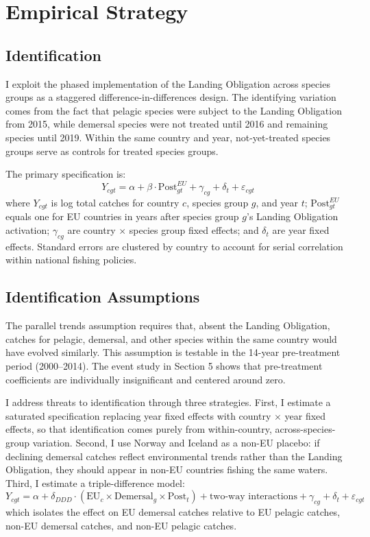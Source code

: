 \documentclass[12pt]{article}
\begin{document}



\section{Empirical Strategy}

\subsection{Identification}

I exploit the phased implementation of the Landing Obligation across species groups as a staggered difference-in-differences design. The identifying variation comes from the fact that pelagic species were subject to the Landing Obligation from 2015, while demersal species were not treated until 2016 and remaining species until 2019. Within the same country and year, not-yet-treated species groups serve as controls for treated species groups.

The primary specification is:
\begin{equation}
Y_{cgt} = \alpha + \beta \cdot \text{Post}_{gt}^{EU} + \gamma_{cg} + \delta_t + \varepsilon_{cgt}
\label{eq:twfe}
\end{equation}
where $Y_{cgt}$ is log total catches for country $c$, species group $g$, and year $t$; $\text{Post}_{gt}^{EU}$ equals one for EU countries in years after species group $g$'s Landing Obligation activation; $\gamma_{cg}$ are country $\times$ species group fixed effects; and $\delta_t$ are year fixed effects. Standard errors are clustered by country to account for serial correlation within national fishing policies.

\subsection{Identification Assumptions}

The parallel trends assumption requires that, absent the Landing Obligation, catches for pelagic, demersal, and other species within the same country would have evolved similarly. This assumption is testable in the 14-year pre-treatment period (2000--2014). The event study in Section 5 shows that pre-treatment coefficients are individually insignificant and centered around zero.

I address threats to identification through three strategies. First, I estimate a saturated specification replacing year fixed effects with country $\times$ year fixed effects, so that identification comes purely from within-country, across-species-group variation. Second, I use Norway and Iceland as a non-EU placebo: if declining demersal catches reflect environmental trends rather than the Landing Obligation, they should appear in non-EU countries fishing the same waters. Third, I estimate a triple-difference model:
\begin{equation}
Y_{cgt} = \alpha + \delta_{DDD} \cdot (\text{EU}_c \times \text{Demersal}_g \times \text{Post}_t) + \text{two-way interactions} + \gamma_{cg} + \delta_t + \varepsilon_{cgt}
\label{eq:ddd}
\end{equation}
which isolates the effect on EU demersal catches relative to EU pelagic catches, non-EU demersal catches, and non-EU pelagic catches.
\end{document}
